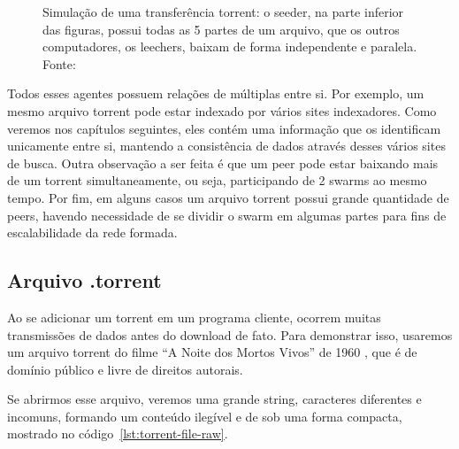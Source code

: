 \begin{figure}[H]
    \vspace{\myvsize}

    \begin{subfigure}[H]{\myhsize}
        \caption{}
        \label{fig:torrent-repr-9}
    \end{subfigure}

    \caption{Simulação de uma transferência torrent: o \gls{seeder}, na parte
    inferior das figuras, possui todas as 5 partes de um arquivo, que os outros
    computadores, os \glspl{leecher}, baixam de forma independente e paralela. Fonte:
    \cite{fig:torrent-dl}}
    \label{fig:torrent-repr}
\end{figure}

Todos esses agentes possuem relações de múltiplas entre si. Por exemplo, um mesmo
arquivo \gls*{torrent} pode estar indexado por vários sites indexadores. Como veremos
nos capítulos seguintes, eles contém uma informação que os identificam unicamente entre
si, mantendo a consistência de dados através desses vários sites de busca. Outra
observação a ser feita é que um \gls*{peer} pode estar baixando mais de um
\gls*{torrent} simultaneamente, ou seja, participando de 2 \glspl*{swarm} ao mesmo
tempo. Por fim, em alguns casos um arquivo \gls*{torrent} possui grande quantidade de
\glspl*{peer}, havendo necessidade de se dividir o \gls*{swarm} em algumas partes para
fins de escalabilidade da rede formada.

\subsection*{Arquivo .torrent}

Ao se adicionar um \gls*{torrent} em um programa cliente, ocorrem muitas transmissões de
dados antes do download de fato. Para demonstrar isso, usaremos um arquivo torrent do
filme ``A Noite dos Mortos Vivos'' de 1960 \cite{torrent-file}, que é de domínio público
e livre de direitos autorais.

Se abrirmos esse arquivo, veremos uma grande \gls{string}, caracteres diferentes e
incomuns, formando um conteúdo ilegível e de sob uma forma compacta, mostrado no
código~\ref{lst:torrent-file-raw}.

